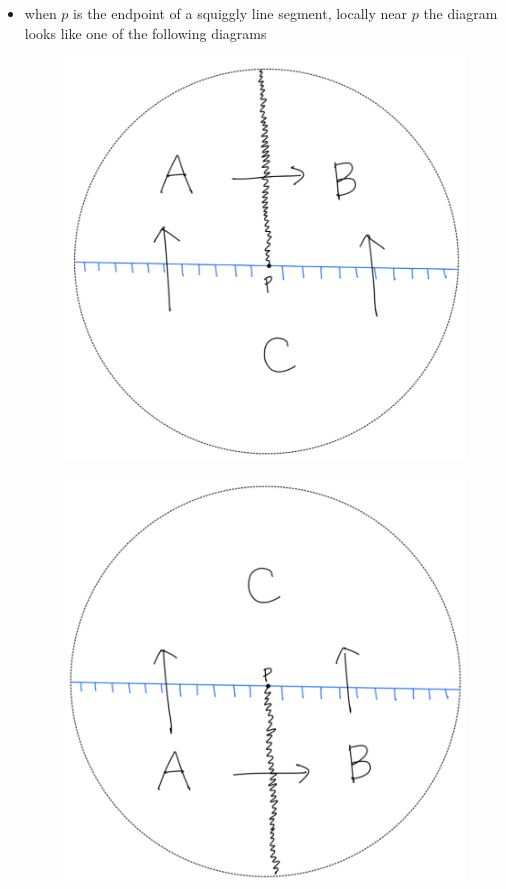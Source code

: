 \begin{itemize}
\begin{itemize}
\item when $p$ is the endpoint of a squiggly line segment, locally near $p$ the diagram looks like one of the following diagrams 
\begin{figure}[H] 
    \centering
    \includegraphics[scale = 0.95]{diagrams/intro/4.png}
    \caption{}
    \label{fig:your-label}
\end{figure}
\begin{figure}[H] 
    \centering
    \includegraphics[scale = 0.95]{diagrams/intro/5.png}

\end{figure}
\end{itemize}
\end{itemize}
